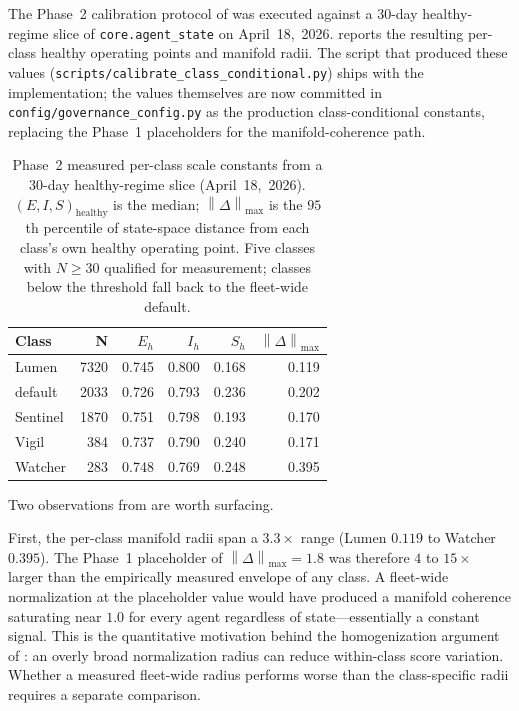 \documentclass[11pt,twocolumn]{article}
\newcommand{\norm}[1]{\left\lVert #1 \right\rVert}
\begin{document}
The Phase~2 calibration protocol of 
was executed against a $30$-day healthy-regime slice of
\texttt{core.agent\_state} on April~18,~2026. 
reports the resulting per-class healthy operating points and
manifold radii. The script that produced these values
(\texttt{scripts/calibrate\_class\_conditional.py}) ships with the
implementation; the values themselves are now committed in
\texttt{config/governance\_config.py} as the production
class-conditional constants, replacing the Phase~1 placeholders
for the manifold-coherence path.

\begin{table}[t]
\centering\small
\caption{Phase~2 measured per-class scale constants from a $30$-day
healthy-regime slice (April~18,~2026). $(E, I, S)_{\text{healthy}}$
is the median; $\norm{\Delta}_{\max}$ is the $95$th percentile of
state-space distance from each class's own healthy operating point.
Five classes with $N \geq 30$ qualified for measurement; classes
below the threshold fall back to the fleet-wide default.}
\label{tab:per-class}
\begin{tabular}{@{}lrrrrr@{}}
\toprule
\textbf{Class} & \textbf{N} & $E_h$ & $I_h$ & $S_h$ & $\norm{\Delta}_{\max}$ \\
\midrule
Lumen     & 7320 & 0.745 & 0.800 & 0.168 & 0.119 \\
default   & 2033 & 0.726 & 0.793 & 0.236 & 0.202 \\
Sentinel  & 1870 & 0.751 & 0.798 & 0.193 & 0.170 \\
Vigil     &  384 & 0.737 & 0.790 & 0.240 & 0.171 \\
Watcher   &  283 & 0.748 & 0.769 & 0.248 & 0.395 \\
\bottomrule
\end{tabular}
\end{table}

Two observations from  are worth surfacing.

First, the per-class manifold radii span a $3.3\times$ range
(Lumen $0.119$ to Watcher $0.395$). The Phase~1 placeholder of
$\norm{\Delta}_{\max} = 1.8$ was therefore $4$ to $15\times$
larger than the empirically measured envelope of any class. A
fleet-wide normalization at the placeholder value would have
produced a manifold coherence saturating near $1.0$ for every
agent regardless of state---essentially a constant signal. This
is the quantitative motivation behind the homogenization argument
of : an overly broad normalization radius can reduce within-class
score variation. Whether a measured fleet-wide radius performs
worse than the class-specific radii requires a separate comparison.
\end{document}
